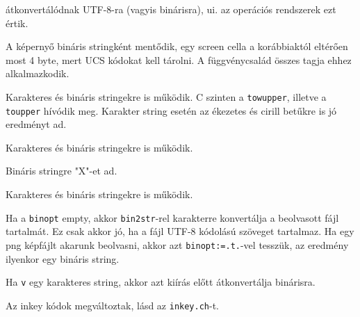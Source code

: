 \begin{description}
    átkonvertálódnak UTF-8-ra (vagyis  binárisra), 
    ui. az operációs rendszerek ezt értik.
\item[{\tt savescreen()}]
    A képernyő bináris stringként mentődik, egy screen
    cella a korábbiaktól eltérően most 4 byte, mert UCS
    kódokat kell tárolni. A függvénycsalád összes tagja
    ehhez alkalmazkodik.
\item[{\tt upper(v)}]
    Karakteres és bináris stringekre is működik.
    C szinten a \verb!towupper!, illetve a \verb!toupper!
    hívódik meg. Karakter string esetén az ékezetes és cirill 
    betűkre is jó eredményt ad.
\item[{\tt val(x)}]
    Karakteres és bináris stringekre is működik.
\item[{\tt valtype(v)}]
    Bináris stringre "X"-et ad.
\item[{\tt like()}]
    Karakteres és bináris stringekre is működik.
\item[{\tt memoread(fspec [,binopt])}]
    Ha a \verb!binopt! empty, akkor \verb!bin2str!-rel
    karakterre konvertálja a beolvasott fájl tartalmát.
    Ez csak akkor jó, ha a fájl UTF-8 kódolású szöveget tartalmaz.
    Ha egy png képfájlt akarunk beolvasni, akkor azt 
    \verb!binopt:=.t.!-vel tesszük, az eredmény ilyenkor
    egy bináris string.
\item[{\tt memowrit(fspec,v)}]
    Ha \verb!v! egy karakteres string, akkor azt kiírás
    előtt átkonvertálja binárisra.
\item[{\tt inkey() }]
    Az inkey kódok megváltoztak, lásd az \verb!inkey.ch!-t.
\end{description}

